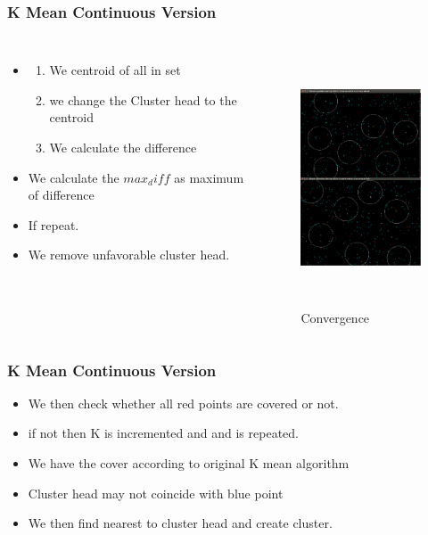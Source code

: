 \documentclass[blue]{beamer}
\begin{document}
\begin{frame}
 \frametitle{K Mean Continuous Version}
 \begin{columns}
 \begin{itemize}
  \item {}
      \begin{enumerate}
       \item We centroid of all {\color{red}{red points}} in set
       \item we change the Cluster head to the centroid
       \item We calculate the difference
      \end{enumerate}
  \item We calculate the $max_diff$ as maximum of difference
  \item If {\color{red}{max$\_$diff $>$ tolerance}} repeat.
  \item We remove unfavorable cluster head.
  \end{itemize}
  \begin{figure}[H]
     \caption{Convergence}
           \scalebox{0.8}
          {\includegraphics[width=\linewidth, height =2.7in]{cover16a.png}}
     \end{figure}
     \end{columns}
\end{frame}



\begin{frame}
 \frametitle{K Mean Continuous Version}
 \begin{itemize}
  \item We then check whether all red points are covered or not.
  \item if not then K is incremented and  {\color{red}{create cluster}} and {\color{red}{change cluster}} is repeated.
  \item We have the cover according to original K mean algorithm
  \item Cluster head may not coincide with blue point
  \item We then find nearest {\color{blue}{blue point}} to cluster head and create cluster.
 \end{itemize}
\end{frame}
\end{document}
